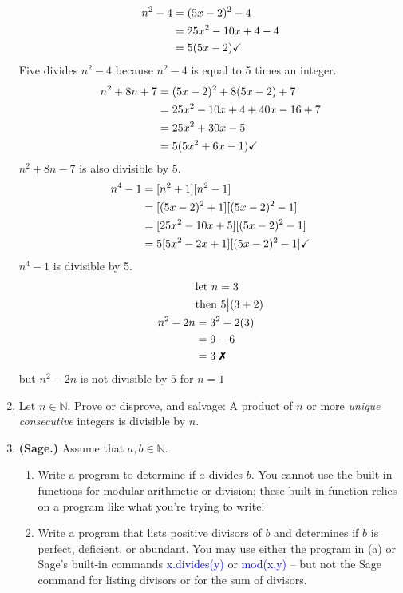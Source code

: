 \documentclass[11 pt]{article}
\theoremstyle{definition}
\theoremstyle{definition}
\def\NN{\mathbb{N}}
\def\divides{\big |}
\begin{document}
\begin{enumerate}
    \begin{align} \setcounter{equation}{0}
        n^2 -4 &= (5x-2)^2-4\\
               &= 25x^2-10x+4-4\\
               &= 5(5x-2)\checkmark
    \end{align}
    Five divides $n^2-4$ because $n^2-4$ is equal to 5 times an integer.
    \begin{align} \setcounter{equation}{0}
        n^2+8n+7 &= (5x-2)^2+8(5x-2)+7\\
                 &= 25x^2-10x+4+40x-16+7\\
                 &= 25x^2+30x-5\\
                 &= 5(5x^2+6x-1)\checkmark
    \end{align}
    $n^2+8n-7$ is also divisible by 5.
    \begin{align} \setcounter{equation}{0}
        n^4-1 &= [n^2+1][n^2-1]\\
              &= [(5x-2)^2+1][(5x-2)^2-1]\\
              &= [25x^2-10x+5][(5x-2)^2-1]\\
              &= 5[5x^2-2x+1][(5x-2)^2-1]\checkmark
    \end{align}
    $n^4-1$ is divisible by 5.
    \begin{align} \setcounter{equation}{0}
               &\text{let $n=3$}\\
               &\text{then $5\divides(3+2)$}\\
        n^2-2n &= 3^2-2(3)\\
               &= 9-6\\
               &=3 \text{ \ding{55}}
    \end{align}
    but $n^2-2n$ is not divisible by $5$ for $n=1$

    \pagebreak%


\item Let $n \in \NN$. Prove or disprove, and salvage: A product of $n$ or more \emph{unique consecutive} integers is divisible by $n$.
    
\item {\bf (Sage.)} Assume that $a, b \in \NN$.
	\begin{enumerate}
	\item Write a program to determine if $a$ divides $b$.  You cannot use the built-in functions for modular arithmetic or division; these built-in function relies on a program like what you're trying to write!
	\item Write a program that lists positive divisors of $b$ and determines if $b$ is perfect, deficient, or abundant.  You may use either the program in (a) or Sage's built-in commands \textcolor{blue}{x.divides(y)} or \textcolor{blue}{mod(x,y)} -- but not the Sage command for listing divisors or for the sum of divisors.
	\end{enumerate}


\end{enumerate}
\end{document}
